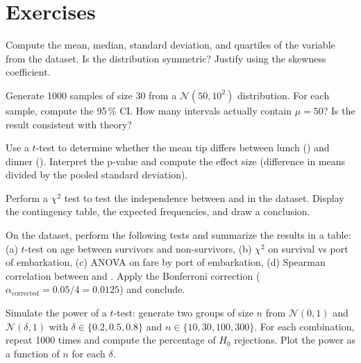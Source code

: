 \section{Exercises}

\begin{exercise}[$\star$]
Compute the mean, median, standard deviation, and quartiles of the  variable from the  dataset. Is the distribution symmetric? Justify using the skewness coefficient.
\end{exercise}

\begin{exercise}[$\star$]
Generate 1000 samples of size 30 from a $\mathcal{N}(50, 10^2)$ distribution. For each sample, compute the 95\,\% CI. How many intervals actually contain $\mu = 50$? Is the result consistent with theory?
\end{exercise}

\begin{exercise}[$\star\star$]
Use a $t$-test to determine whether the mean tip differs between lunch () and dinner (). Interpret the p-value and compute the effect size (difference in means divided by the pooled standard deviation).
\end{exercise}

\begin{exercise}[$\star\star$]
Perform a $\chi^2$ test to test the independence between  and  in the  dataset. Display the contingency table, the expected frequencies, and draw a conclusion.
\end{exercise}

\begin{exercise}[$\star\star\star$]
On the  dataset, perform the following tests and summarize the results in a table: (a) $t$-test on age between survivors and non-survivors, (b) $\chi^2$ on survival vs port of embarkation, (c) ANOVA on fare by port of embarkation, (d) Spearman correlation between  and . Apply the Bonferroni correction ($\alpha_{\text{corrected}} = 0.05 / 4 = 0.0125$) and conclude.
\end{exercise}

\begin{exercise}[$\star\star\star$]
Simulate the power of a $t$-test: generate two groups of size $n$ from $\mathcal{N}(0, 1)$ and $\mathcal{N}(\delta, 1)$ with $\delta \in \{0.2, 0.5, 0.8\}$ and $n \in \{10, 30, 100, 300\}$. For each combination, repeat 1000 times and compute the percentage of $H_0$ rejections. Plot the power as a function of $n$ for each $\delta$.
\end{exercise}

